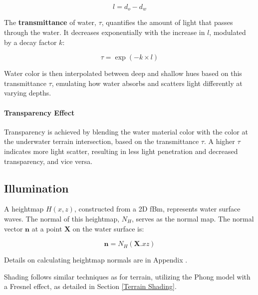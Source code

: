 \begin{equation}
   l = d_{o}-d_w
\end{equation}

The \textbf{transmittance} of water, $\tau$, quantifies the amount of light that passes through the water. It decreases exponentially with the increase in $l$, modulated by a decay factor $k$:

\begin{equation}
    \tau = \exp(-k \times l)
\end{equation}
   
Water color is then interpolated between deep and shallow hues based on this transmittance $\tau$, emulating how water absorbs and scatters light differently at varying depths.

\paragraph{Transparency Effect}

Transparency is achieved by blending the water material color with the color at the underwater terrain intersection, based on the transmittance $\tau$. A higher $\tau$ indicates more light scatter, resulting in less light penetration and decreased transparency, and vice versa.

\subsection{Illumination}
\label{Water Shading}

A heightmap $H(x,z)$, constructed from a 2D fBm, represents water surface waves. The normal of this heightmap, $N_H$, serves as the normal map. The normal vector $\mathbf{n}$ at a point $\mathbf{X}$ on the water surface is:

\begin{equation}
\mathbf{n}= N_{H}(\mathbf{X}.xz)
\end{equation}

Details on calculating heightmap normals are in Appendix .

Shading follows similar techniques as for terrain, utilizing the Phong model with a Fresnel effect, as detailed in Section \ref{Terrain Shading}. 


